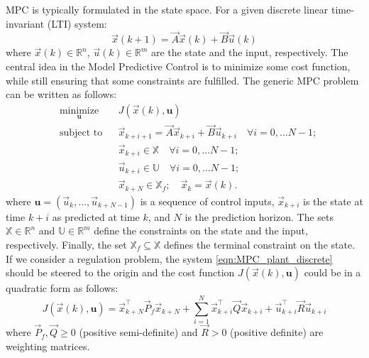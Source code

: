 MPC is typically formulated in the state space. For a given discrete linear time-invariant (LTI) system:
\begin{equation}
\label{eqn:MPC_plant_discrete}
\vec{x}(k+1)=\vec{A}\vec{x}(k)+ \vec{B} \vec{u}(k)
\end{equation}
where $\vec{x}(k)\in\mathbb{R}^n$, $\vec{u}(k)\in\mathbb{R}^m$ are the state and the input, respectively. The central idea in the Model Predictive Control is to minimize some cost function, while still ensuring that some constraints are fulfilled. The generic MPC problem can be written as follows:
\begin{equation}
\label{eqn:MPC_optimization}
\begin{aligned}
& \underset{\textbf{u}}{\text{minimize}}
& & J(\vec{x}(k), \textbf{u}) \\
& \text{subject to}
& & \vec{x}_{k+i+1} = \vec{A}\vec{x}_{k+i}+ \vec{B} \vec{u}_{k+i}\quad\forall i=0,\dots N-1;\\
& & & \vec{x}_{k+i}\in \mathbb{X}\quad\forall i=0,\dots N-1;\\
& & & \vec{u}_{k+i}\in \mathbb{U}\quad\forall i=0,\dots N-1;\\  
& & & \vec{x}_{k+N}\in \mathbb{X}_f;\quad\vec{x}_k = \vec{x}(k).
\end{aligned}
\end{equation}
where $\textbf{u}=(\vec{u}_k,\dots,\vec{u}_{k+N-1})$ is a sequence of control inputs, $\vec{x}_{k+i}$ is the state at time $k+i$ as predicted at time $k$, and $N$ is the prediction horizon. The sets $\mathbb{X}\in\mathbb{R}^n$ and $\mathbb{U}\in\mathbb{R}^m$ define the constraints on the state and the input, respectively. Finally, the set $\mathbb{X}_f\subseteq\mathbb{X}$ defines the terminal constraint on the state. If we consider a regulation problem, the system \ref{eqn:MPC_plant_discrete} should be steered to the origin and the cost function $J(\vec{x}(k), \textbf{u})$ could be in a quadratic form as follows:
\begin{equation}
\label{eqn:MPC_cost_function_regulation}
	J(\vec{x}(k), \textbf{u}) = \vec{x}^\intercal_{k+N}\vec{P}_f\vec{x}_{k+N}+\sum_{i=1}^{N}\vec{x}^\intercal_{k+i}\vec{Q}\vec{x}_{k+i}+\vec{u}_{k+i}^\intercal\vec{R}\vec{u}_{k+i}
\end{equation}
where $\vec{P}_f,\vec{Q}\geq0$ (positive semi-definite) and $\vec{R}>0$ (positive definite) are weighting matrices.

